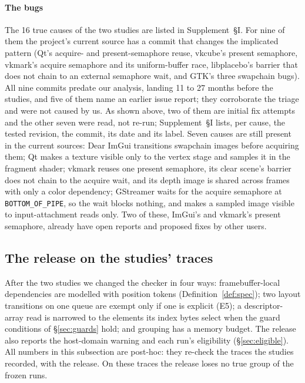 \documentclass[acmtog,anonymous,review]{acmart}
\newcommand{\code}[1]{\texttt{#1}}
\newcommand{\supp}[1]{Supplement~\S#1}
\begin{document}
\paragraph{The bugs}
The 16 true causes of the two studies are listed in \supp{I}. For nine of them the project's current source has a
commit that changes the implicated pattern (Qt's acquire- and present-semaphore reuse, vkcube's present semaphore,
vkmark's acquire semaphore and its uniform-buffer race, libplacebo's barrier that does not chain to an external
semaphore wait, and GTK's three swapchain bugs). All nine commits predate our analysis, landing 11 to 27 months before
the studies, and five of them name an earlier issue report; they corroborate the triage and were not caused by us.
As shown above, two of them are initial fix attempts and the other seven were read, not re-run; \supp{I} lists, per
cause, the tested revision, the commit, its date and its label. Seven causes are still present in the current
sources: Dear ImGui transitions swapchain images before acquiring them; Qt makes a texture visible only to the vertex
stage and samples it in the fragment shader; vkmark reuses one present semaphore, its clear scene's barrier does not
chain to the acquire wait, and its depth image is shared across frames with only a color dependency; GStreamer waits
for the acquire semaphore at \code{BOTTOM\_OF\_PIPE}, so the wait blocks nothing, and makes a sampled image visible to
input-attachment reads only. Two of these, ImGui's and vkmark's present semaphore, already have open reports and
proposed fixes by other users.

\subsection{The release on the studies' traces}
\label{sec:eval-release}
After the two studies we changed the checker in four ways: framebuffer-local dependencies are modelled with position
tokens (Definition~\ref{def:spec}); two layout transitions on one queue are exempt only if one is explicit (E5); a
descriptor-array read is narrowed to the elements its index bytes select when the guard conditions of
\S\ref{sec:guards} hold; and grouping has a memory budget. The release also reports the host-domain warning and each
run's eligibility (\S\ref{sec:eligible}). All numbers in this subsection are post-hoc: they re-check the traces the
studies recorded, with the release. On these traces the release loses no true group of the frozen runs.
\end{document}
